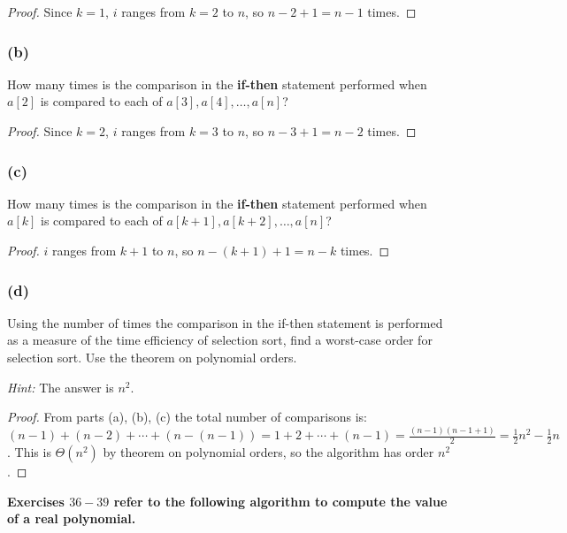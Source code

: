 \documentclass[14pt]{extarticle}
\newcommand{\cy}{\color{cyan}}
\begin{document}
\begin{proof}
Since \(k = 1\), \(i\) ranges from \(k=2\) to \(n\), so \(n-2+1 = n-1\) times.
\end{proof}

\subsubsection{(b)}
How many times is the comparison in the {\bf if-then} statement performed when \(a[2]\) is compared to each of 
\(a[3], a[4], \ldots, a[n]\)?

\begin{proof}
Since \(k = 2\), \(i\) ranges from \(k=3\) to \(n\), so \(n-3+1 = n-2\) times.
\end{proof}

\subsubsection{(c)}
How many times is the comparison in the {\bf if-then} statement performed when \(a[k]\) is compared to each of 
\(a[k+1], a[k+2], \ldots, a[n]\)?

\begin{proof}
\(i\) ranges from \(k+1\) to \(n\), so \(n-(k+1)+1 = n-k\) times.
\end{proof}

\subsubsection{(d)}
Using the number of times the comparison in the if-then statement is performed as a measure of the time efficiency of 
selection sort, find a worst-case order for selection sort. Use the theorem on polynomial orders.

{\it Hint:} The answer is \(n^2\).

\begin{proof}
From parts (a), (b), (c) the total number of comparisons is: \((n-1) + (n-2) + \cdots + (n-(n-1)) = 1+2+\cdots+(n-1) =
\frac{(n-1)(n-1+1)}{2} = \frac{1}{2}n^2 - \frac{1}{2}n\). This is \(\Theta(n^2)\) by theorem on polynomial orders, so the 
algorithm has order \(n^2\).
\end{proof}

{\bf \cy Exercises \(36-39\) refer to the following algorithm to compute the value of a real polynomial.}
\end{document}
